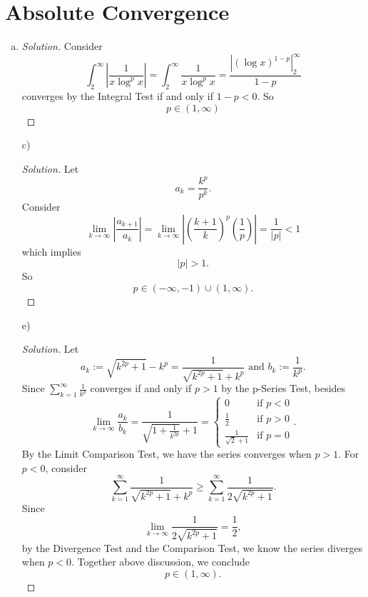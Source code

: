 \documentclass{report}
\newenvironment{solution}
  {\begin{proof}[Solution]}
  {\end{proof}}
\begin{document}
\section{Absolute Convergence}
\setcounter{Exercise}{2}
\begin{Exercise}
\begin{enumerate}[a)]
\item
\begin{solution}
Consider $$\int_{2}^{\infty}\left|\frac{1}{x\log^p{x}}\right| = \int_{2}^{\infty}\frac{1}{x\log^p{x}} = \frac{\left|(\log{x})^{1-p}\right|_{2}^{\infty}}{1-p} $$
converges by the Integral Test if and only if $1-p<0$. So $$p \in (1,\infty)$$
\end{solution}

\item [c)]
\begin{solution}
Let $$a_k = \frac{k^p}{p^k}. $$
Consider
$$\lim_{k\to\infty}\left|\frac{a_{k+1}}{a_k}\right| = \lim_{k\to\infty}\left|\left(\frac{k+1}{k}\right)^p\left(\frac{1}{p}\right)\right| = \frac{1}{|p|} < 1$$
which implies $$|p|>1.$$
So$$p\in(-\infty,-1)\cup (1,\infty).$$
\end{solution}

\item [e)]
\begin{solution}
Let $$a_k := \sqrt{k^{2p}+1}-k^p = \frac{1}{\sqrt{k^{2p}+1}+k^p}\text{ and } b_k := \frac{1}{k^p}.$$
Since $\sum_{k=1}^{\infty}\frac{1}{k^p}$ converges if and only if $p>1$ by the p-Series Test, besides
$$\lim_{k\to\infty}\frac{a_k}{b_k} = \frac{1}{\sqrt{1+\frac{1}{k^{2p}}}+1} = \begin{cases}0 & \mbox{if }p<0 \\ \frac{1}{2} & \mbox{if }p>0 \\ \frac{1}{\sqrt{2}+1} & \mbox{if } p = 0\end{cases}.$$
By the Limit Comparison Test, we have the series converges when $p>1$. For $p<0$, consider $$\sum_{k=1}^{\infty}\frac{1}{\sqrt{k^{2p}+1}+k^p} \geq \sum_{k=1}^{\infty}\frac{1}{2\sqrt{k^{2p}+1}}.$$
Since $$\lim_{k\to\infty}\frac{1}{2\sqrt{k^{2p}+1}} = \frac{1}{2},$$
by the Divergence Test and the Comparison Test, we know the series diverges when $p<0$.
Together above discussion, we conclude $$p\in(1,\infty).$$
\end{solution}
\end{enumerate}
\end{Exercise}
\end{document}
